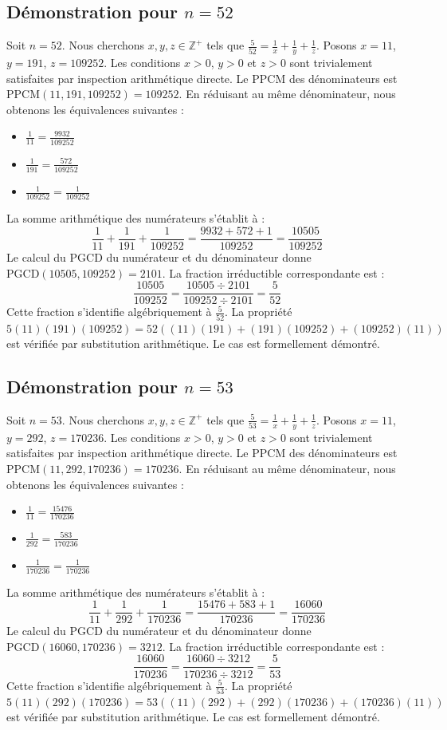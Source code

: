 \documentclass[12pt,a4paper]{article}
\begin{document}
\subsection{Démonstration pour $n = 52$}
Soit $n = 52$. Nous cherchons $x, y, z \in \mathbb{Z}^{+}$ tels que $\frac{5}{52} = \frac{1}{x} + \frac{1}{y} + \frac{1}{z}$.
Posons $x = 11$, $y = 191$, $z = 109252$.
Les conditions $x > 0$, $y > 0$ et $z > 0$ sont trivialement satisfaites par inspection arithmétique directe.
Le PPCM des dénominateurs est $\text{PPCM}(11, 191, 109252) = 109252$.
En réduisant au même dénominateur, nous obtenons les équivalences suivantes :
\begin{itemize}
    \item $\frac{1}{11} = \frac{9932}{109252}$
    \item $\frac{1}{191} = \frac{572}{109252}$
    \item $\frac{1}{109252} = \frac{1}{109252}$
\end{itemize}
La somme arithmétique des numérateurs s'établit à :
$$ \frac{1}{11} + \frac{1}{191} + \frac{1}{109252} = \frac{9932 + 572 + 1}{109252} = \frac{10505}{109252} $$
Le calcul du PGCD du numérateur et du dénominateur donne $\text{PGCD}(10505, 109252) = 2101$.
La fraction irréductible correspondante est :
$$ \frac{10505}{109252} = \frac{10505 \div 2101}{109252 \div 2101} = \frac{5}{52} $$
Cette fraction s'identifie algébriquement à $\frac{5}{52}$.
La propriété $5(11)(191)(109252) = 52((11)(191) + (191)(109252) + (109252)(11))$ est vérifiée par substitution arithmétique.
Le cas est formellement démontré.

\subsection{Démonstration pour $n = 53$}
Soit $n = 53$. Nous cherchons $x, y, z \in \mathbb{Z}^{+}$ tels que $\frac{5}{53} = \frac{1}{x} + \frac{1}{y} + \frac{1}{z}$.
Posons $x = 11$, $y = 292$, $z = 170236$.
Les conditions $x > 0$, $y > 0$ et $z > 0$ sont trivialement satisfaites par inspection arithmétique directe.
Le PPCM des dénominateurs est $\text{PPCM}(11, 292, 170236) = 170236$.
En réduisant au même dénominateur, nous obtenons les équivalences suivantes :
\begin{itemize}
    \item $\frac{1}{11} = \frac{15476}{170236}$
    \item $\frac{1}{292} = \frac{583}{170236}$
    \item $\frac{1}{170236} = \frac{1}{170236}$
\end{itemize}
La somme arithmétique des numérateurs s'établit à :
$$ \frac{1}{11} + \frac{1}{292} + \frac{1}{170236} = \frac{15476 + 583 + 1}{170236} = \frac{16060}{170236} $$
Le calcul du PGCD du numérateur et du dénominateur donne $\text{PGCD}(16060, 170236) = 3212$.
La fraction irréductible correspondante est :
$$ \frac{16060}{170236} = \frac{16060 \div 3212}{170236 \div 3212} = \frac{5}{53} $$
Cette fraction s'identifie algébriquement à $\frac{5}{53}$.
La propriété $5(11)(292)(170236) = 53((11)(292) + (292)(170236) + (170236)(11))$ est vérifiée par substitution arithmétique.
Le cas est formellement démontré.
\end{document}
